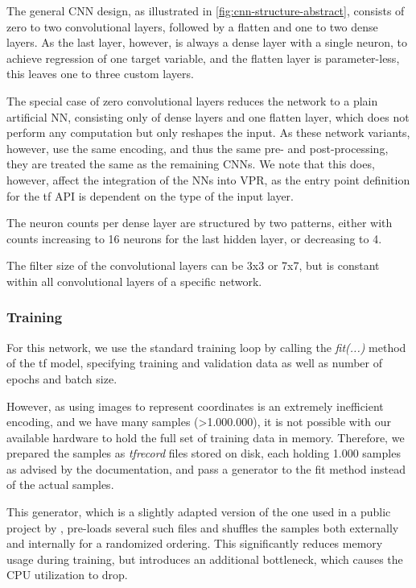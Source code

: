 The general \gls{CNN} design, as illustrated in \ref{fig:cnn-structure-abstract}, consists of zero to two convolutional layers, followed by a flatten and one to two dense layers. As the last layer, however, is always a dense layer with a single neuron, to achieve regression of one target variable, and the flatten layer is parameter-less, this leaves one to three custom layers. 

The special case of zero convolutional layers reduces the network to a plain artificial \gls{NN}, consisting only of dense layers and one flatten layer, which does not perform any computation but only reshapes the input. As these network variants, however, use the same encoding, and thus the same pre- and post-processing, they are treated the same as the remaining \glspl{CNN}. We note that this does, however, affect the integration of the \glspl{NN} into \gls{VPR}, as the entry point definition for the \gls{tf} API is dependent on the type of the input layer.\cite{TODO-changed}

The neuron counts per dense layer are structured by two patterns, either with counts increasing to 16 neurons for the last hidden layer, or decreasing to 4.

The filter size of the convolutional layers can be 3x3 or 7x7, but is constant within all convolutional layers of a specific network.

\subsubsection{Training}

For this network, we use the standard training loop by calling the \textit{fit(...)} method of the \gls{tf} model, specifying training and validation data as well as number of epochs and batch size.

However, as using images to represent coordinates is an extremely inefficient encoding, and we have many samples (>1.000.000)\cite{TODO}, it is not possible with our available hardware to hold the full set of training data in memory. Therefore, we prepared the samples as \textit{tfrecord} files stored on disk, each holding 1.000 samples as advised by the documentation\cite{TODO}, and pass a generator to the fit method instead of the actual samples.

This generator, which is a slightly adapted version of the one used in a public project by \cite{TODO}, pre-loads several such files and shuffles the samples both externally and internally for a randomized ordering. This significantly reduces memory usage during training, but introduces an additional bottleneck, which causes the CPU utilization to drop.

